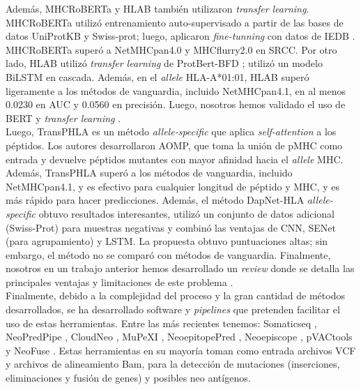 \documentclass[a4paper]{article}
\begin{document}
Además, MHCRoBERTa \citep{wang2022mhcroberta} y HLAB \citep{zhang2022hlab} también utilizaron \textit{transfer learning}. MHCRoBERTa utilizó entrenamiento auto-supervisado a partir de las bases de datos UniProtKB y Swiss-prot; luego, aplicaron \textit{fine-tunning} con datos de IEDB \citep{vita2019immune}. MHCRoBERTa superó a NetMHCpan4.0 y MHCflurry2.0 en SRCC. Por otro lado, HLAB \citep{zhang2022hlab} utilizó \textit{transfer learning} de ProtBert-BFD \citep{elnaggar2021prottrans}; utilizó un modelo BiLSTM en cascada. Además, en el \textit{allele} HLA-A*01:01, HLAB superó ligeramente a los métodos de vanguardia, incluido NetMHCpan4.1, en al menos 0.0230 en AUC y 0.0560 en precisión. Luego, nosotros hemos validado el uso de BERT y \textit{transfer learning} \citep{arceda2023neoantigen}.\\

Luego, TransPHLA \citep{chu2022transformer} es un método \textit{allele-specific} que aplica \textit{self-attention} a los péptidos. Los autores desarrollaron AOMP, que toma la unión de pMHC como entrada y devuelve péptidos mutantes con mayor afinidad hacia el \textit{allele} MHC. Además, TransPHLA superó a los métodos de vanguardia, incluido NetMHCpan4.1, y es efectivo para cualquier longitud de péptido y MHC, y es más rápido para hacer predicciones. Además, el método DapNet-HLA \textit{allele-specific} \citep{jing2023dapnet} obtuvo resultados interesantes, utilizó un conjunto de datos adicional (Swiss-Prot) para muestras negativas y combinó las ventajas de CNN, SENet (para agrupamiento) y LSTM. La propuesta obtuvo puntuaciones altas; sin embargo, el método no se comparó con métodos de vanguardia. Finalmente, nosotros en un trabajo anterior hemos desarrollado un \textit{review} donde se detalla las principales ventajas y limitaciones de este problema \citep{machaca2023deep}.\\


Finalmente, debido a la complejidad del proceso y la gran cantidad de métodos desarrollados, se ha desarrollado software y \textit{pipelines} que pretenden facilitar el uso de estas herramientas. Entre las más recientes tenemos: Somaticseq \citep{fang2015ensemble}, NeoPredPipe \citep{schenck2019neopredpipe}, CloudNeo \citep{bais2017cloudneo}, MuPeXI \citep{bjerregaard2017mupexi}, NeoepitopePred \citep{tran2015immunogenicity}, Neoepiscope \citep{yossef2018enhanced}, pVACtools \citep{hundal2020pvactools}  y NeoFuse \citep{gros2016prospective}. Estas herramientas en su mayoría toman como entrada archivos VCF y archivos de alineamiento Bam, para la detección de mutaciones (inserciones, eliminaciones y fusión de genes) y posibles neo antígenos. 
\end{document}
